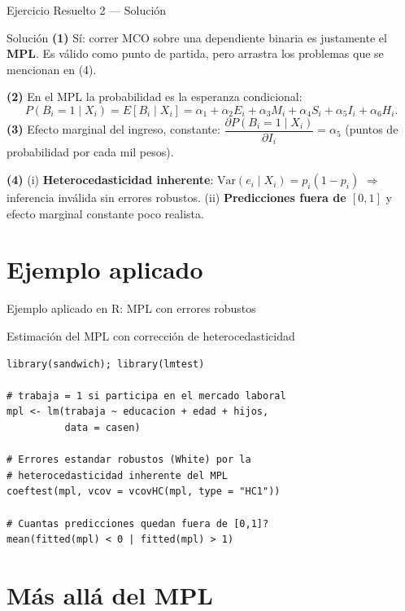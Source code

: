 \documentclass{beamer}
\begin{document}
\begin{frame}{Ejercicio Resuelto 2 — Solución}
\begin{exampleblock}{Solución}
\textbf{(1)} Sí: correr MCO sobre una dependiente binaria es justamente el \textbf{MPL}. Es válido como punto de partida, pero arrastra los problemas que se mencionan en (4).

\textbf{(2)} En el MPL la probabilidad es la esperanza condicional:
\[
P(B_i=1\mid X_i)=E[B_i\mid X_i]=\alpha_1+\alpha_2 E_i+\alpha_3 M_i+\alpha_4 S_i+\alpha_5 I_i+\alpha_6 H_i.
\]
\textbf{(3)} Efecto marginal del ingreso, constante:
$\dfrac{\partial P(B_i=1\mid X_i)}{\partial I_i}=\alpha_5$ (puntos de probabilidad por cada mil pesos).

\textbf{(4)} (i) \textbf{Heterocedasticidad inherente}: $\text{Var}(e_i\mid X_i)=p_i(1-p_i)$ $\Rightarrow$ inferencia inválida sin errores robustos. (ii) \textbf{Predicciones fuera de $[0,1]$} y efecto marginal constante poco realista.
\end{exampleblock}
\end{frame}

\section{Ejemplo aplicado}

\begin{frame}[fragile]{Ejemplo aplicado en R: MPL con errores robustos}
\begin{exampleblock}{Estimación del MPL con corrección de heterocedasticidad}
\begin{verbatim}
library(sandwich); library(lmtest)

# trabaja = 1 si participa en el mercado laboral
mpl <- lm(trabaja ~ educacion + edad + hijos,
          data = casen)

# Errores estandar robustos (White) por la
# heterocedasticidad inherente del MPL
coeftest(mpl, vcov = vcovHC(mpl, type = "HC1"))

# Cuantas predicciones quedan fuera de [0,1]?
mean(fitted(mpl) < 0 | fitted(mpl) > 1)
\end{verbatim}
\end{exampleblock}
\end{frame}

\section{Más allá del MPL}
\end{document}
